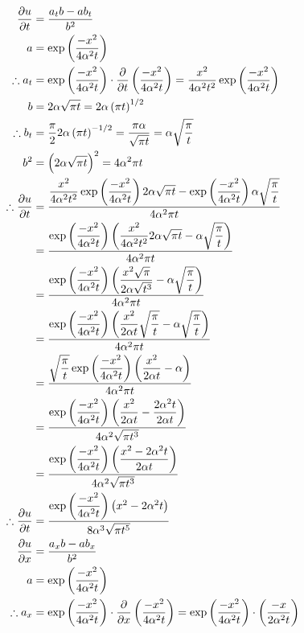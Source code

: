 \documentclass[a4paper, 11pt]{report}
\begin{document}
\begin{align*}
	\del{u}{t} &= \frac{a_tb - ab_t}{b^2} \\
 	a &= \exp\bracks{\frac{-x^2}{4\alpha^2 t}} \\
 	\tf a_t &= \exp\bracks{\frac{-x^2}{4\alpha^2 t}} \cd \del{}{t}\bracks{\frac{-x^2}{4\alpha^2 t}} 
 		 = \frac{x^2}{4\alpha^2 t^2} \exp\bracks{\frac{-x^2}{4\alpha^2 t}} \\
 	b &= 2\alpha\sqrt{\pi t} 
 		 = 2\alpha\bracks{\pi t}^{1/2} \\
 	\tf b_t &= \frac{\pi}{2}2\alpha\bracks{\pi t}^{-1/2} 
 		 = \frac{\pi\alpha}{\sqrt{\pi t}} 
 		 = \alpha\sqrt{\frac{\pi}{t}} \\
 	b^2 &= \bracks{2\alpha\sqrt{\pi t}}^2 
 		 = 4\alpha^2\pi t \\
	\tf\del{u}{t} &= \frac{\dfrac{x^2}{4\alpha^2 t^2} \exp\bracks{\dfrac{-x^2}{4\alpha^2 t}}2\alpha\sqrt{\pi t} - \exp\bracks{\dfrac{-x^2}{4\alpha^2 t}}\alpha\sqrt{\dfrac{\pi}{t}}}{4\alpha^2\pi t} \\
		&= \frac{\exp\bracks{\dfrac{-x^2}{4\alpha^2 t}} \bracks{\dfrac{x^2}{4\alpha^2 t^2}2\alpha\sqrt{\pi t} - \alpha\sqrt{\dfrac{\pi}{t}}}}{4\alpha^2\pi t} \\
		&= \frac{\exp\bracks{\dfrac{-x^2}{4\alpha^2 t}} \bracks{\dfrac{ x^2\sqrt{\pi}}{2\alpha \sqrt{t^3}} - \alpha\sqrt{\dfrac{\pi}{t}}}}{4\alpha^2\pi t} \\
		&= \frac{\exp\bracks{\dfrac{-x^2}{4\alpha^2 t}} \bracks{\dfrac{ x^2}{2\alpha t}\sqrt{\dfrac{\pi}{t}} - \alpha\sqrt{\dfrac{\pi}{t}}}}{4\alpha^2\pi t} \\
		&= \frac{\sqrt{\dfrac{\pi}{t}} \exp\bracks{\dfrac{-x^2}{4\alpha^2 t}} \bracks{\dfrac{ x^2}{2\alpha t} - \alpha}}{4\alpha^2\pi t} \\
		&= \frac{\exp\bracks{\dfrac{-x^2}{4\alpha^2 t}} \bracks{\dfrac{ x^2}{2\alpha t} - \dfrac{2\alpha^2 t}{2\alpha t}}}{4\alpha^2\sqrt{\pi t^3}} \\
		&= \frac{\exp\bracks{\dfrac{-x^2}{4\alpha^2 t}} \bracks{\dfrac{x^2 - 2\alpha^2 t}{2\alpha t}}}{4\alpha^2\sqrt{\pi t^3}} \\
	\tf\del{u}{t} &= \frac{\exp\bracks{\dfrac{-x^2}{4\alpha^2 t}} \bracks{x^2 - 2\alpha^2 t}}{8\alpha^3\sqrt{\pi t^5}} \\
	\del{u}{x} &= \frac{a_xb - ab_x}{b^2} \\
   a &= \exp\bracks{\frac{-x^2}{4\alpha^2 t}} \\
   \tf a_x &= \exp\bracks{\frac{-x^2}{4\alpha^2 t}} \cd \del{}{x}\bracks{\frac{-x^2}{4\alpha^2 t}}
    	= \exp\bracks{\frac{-x^2}{4\alpha^2 t}} \cd \bracks{\frac{-x}{2\alpha^2 t}} 

\end{align*}
\end{document}
